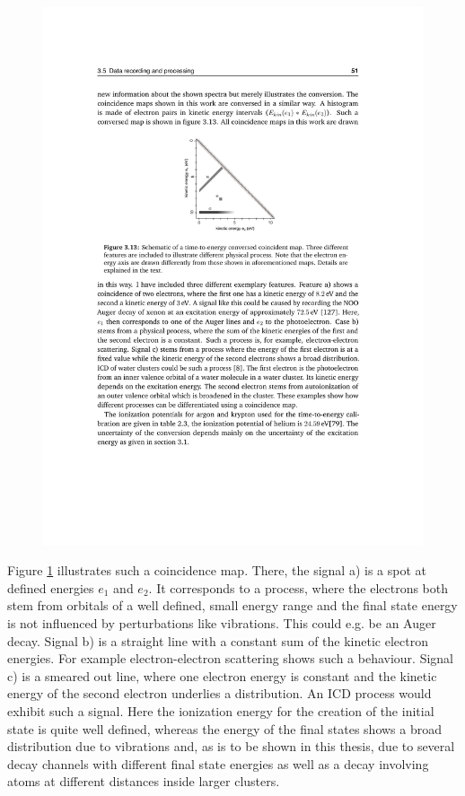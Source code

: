 \begin{figure}[h]
  \centering
  \includegraphics{pics/ee_coincidence_processes.pdf}
  \caption{}
  \label{figure:ee_coincidence_processes}
\end{figure}

Figure \ref{figure:ee_coincidence_processes} illustrates such a coincidence
map. There, the signal a) is a spot at defined energies $e_1$ and $e_2$.
It corresponds to a process, where the electrons both stem from orbitals
of a well defined, small energy range and the final state energy is not
influenced by perturbations like vibrations. This could e.g. be an Auger
decay.
Signal b) is a straight line with a constant sum of the kinetic electron
energies. For example electron-electron scattering shows such a behaviour.
Signal c) is a smeared out line, where one electron energy is constant
and the kinetic energy of the second electron underlies a distribution.
An ICD process would exhibit such a signal. Here the ionization energy
for the creation of the initial state is quite well defined, whereas
the energy of the final states shows a broad distribution due to
vibrations and, as is to be shown in this thesis, due to several decay
channels with different final state energies as well as a decay involving
atoms at different distances inside larger clusters.

